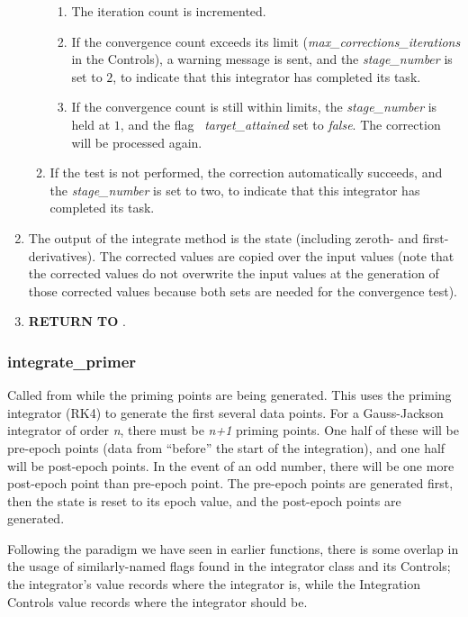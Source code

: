 \begin{enumerate}
\begin{enumerate}
\begin{enumerate}
\item The iteration count is incremented.
\item If the convergence count exceeds its limit
(\textit{max\_corrections\_iterations} in the Controls), a
warning message is sent, and the \textit{stage\_number} is set to $2$,
to indicate that this integrator has completed its task.
\item If the convergence count is still within limits, the
\textit{stage\_number} is held at $1$, and the flag
\ \textit{target\_attained }set to \textit{false}. The correction
will be processed again.
\end{enumerate}

\item If the test is not performed, the correction
automatically succeeds, and the \textit{stage\_number} is set to two,
to indicate that this integrator has completed its task.
\end{enumerate}
\item The output of the integrate method is the state (including zeroth-
and first- derivatives). The corrected values are copied over the
input values (note that the corrected values do not overwrite the input
values at the generation of those corrected values because both sets
are needed for the convergence test).
\item {\bfseries RETURN TO} .
\end{enumerate}

\subsubsection{integrate\_primer}\label{ref:GJ_integrate_primer}

Called from  while the priming points
are being
generated. This uses the priming integrator (RK4) to generate the
first several data points. For a Gauss-Jackson integrator of order
\textit{n}, there must be \textit{n+1} priming points. One half of
these will be pre-epoch points (data from
{\textquotedblleft}before{\textquotedblright} the start of the
integration), and one half will be post-epoch points. In the event of
an odd number, there will be one more post-epoch point than pre-epoch
point. The pre-epoch points are generated first, then the state is
reset to its epoch value, and the post-epoch points are generated.

Following the paradigm we have seen in earlier functions, there is some
overlap in the usage of similarly-named flags found in the integrator class 
and its Controls;
the integrator's value records
where the integrator is, while the Integration Controls value records
where the integrator should be.

